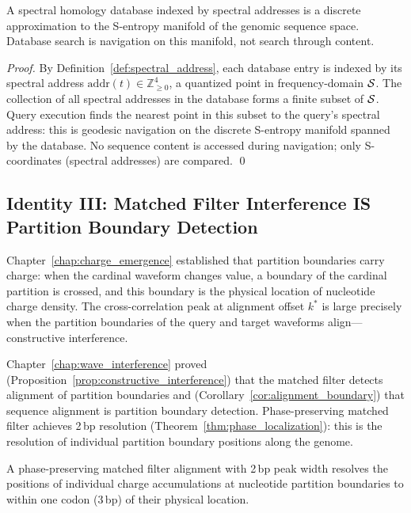 \begin{proposition}
\label{prop:genomic_smap}
A spectral homology database indexed by spectral addresses is a discrete
approximation to the S-entropy manifold of the genomic sequence space.
Database search is navigation on this manifold, not search through content.
\end{proposition}

\begin{proof}
By Definition~\ref{def:spectral_address}, each database entry is indexed by
its spectral address $\mathrm{addr}(t) \in \mathbb{Z}_{\geq 0}^4$, a
quantized point in frequency-domain $\mathcal{S}$. The collection of all spectral
addresses in the database forms a finite subset of $\mathcal{S}$. Query execution
finds the nearest point in this subset to the query's spectral address: this
is geodesic navigation on the discrete S-entropy manifold spanned by the
database. No sequence content is accessed during navigation; only S-coordinates
(spectral addresses) are compared. \qed
\end{proof}

\subsection{Identity III: Matched Filter Interference IS Partition Boundary Detection}
\label{subsec:identity_III}

Chapter~\ref{chap:charge_emergence} established that partition boundaries
carry charge: when the cardinal waveform changes value, a boundary of the
cardinal partition is crossed, and this boundary is the physical location of
nucleotide charge density. The cross-correlation peak at alignment offset $k^*$
is large precisely when the partition boundaries of the query and target waveforms
align---constructive interference.

Chapter~\ref{chap:wave_interference} proved (Proposition~\ref{prop:constructive_interference})
that the matched filter detects alignment of partition boundaries and
(Corollary~\ref{cor:alignment_boundary}) that sequence alignment is partition
boundary detection. Phase-preserving matched filter achieves 2\,bp resolution
(Theorem~\ref{thm:phase_localization}): this is the resolution of individual
partition boundary positions along the genome.

\begin{proposition}
\label{prop:charge_resolution}
A phase-preserving matched filter alignment with 2\,bp peak width resolves
the positions of individual charge accumulations at nucleotide partition
boundaries to within one codon (3\,bp) of their physical location.
\end{proposition}

